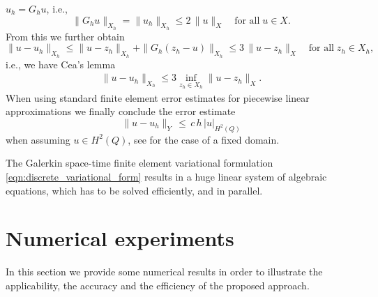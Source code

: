 \documentclass[12pt]{article}
\numberwithin{equation}{section}
\begin{document}
$u_h = G_h u$, i.e.,
\[
  \| G_h u \|_{X_h} = \| u_h \|_{X_h} \leq 2 \, \| u \|_X \quad
  \mbox{for all} \; u \in X .
\]
From this we further obtain
\[
  \| u - u_h \|_{X_h} \leq \| u - z_h \|_{X_h} + \| G_h(z_h-u) \|_{X_h} \leq
  3 \, \| u - z_h \|_X \quad \mbox{for all} \; z_h \in X_h,
\]
i.e., we have Cea's lemma
\begin{align}\label{eqn:Ceas_lemma}
  \| u - u_h\|_{X_h} \leq 3 \inf \limits_{z_h \in X_h} \|u - z_h\|_X .
\end{align}
When using standard finite element error estimates
\cite{BrennerScott:2008,St08}
for piecewise linear approximations we finally conclude the error estimate 
\[
\| u - u_h \|_Y \, \leq \, c \, h \, |u|_{H^2(Q)}
\]
when assuming $u \in H^2(Q)$, see \cite{St15} for the case of a fixed
domain.

The Galerkin space-time finite element variational formulation
\eqref{eqn:discrete_variational_form} results in a huge linear system
of algebraic equations, which has to be solved efficiently, and in parallel.

	\section{Numerical experiments}\label{sec:numerical_experiments}
In this section we provide some numerical results in order to illustrate
the applicability, the accuracy and the efficiency of the proposed approach.
\end{document}
